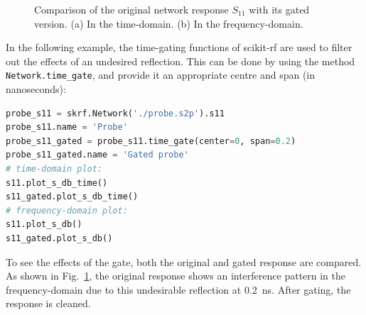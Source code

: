 \documentclass[10pt, letterpaper]{scrartcl}
\newcommand{\skrf}{{s}cikit-rf\xspace}
\begin{document}
\begin{figure}
	\centering
	\caption{Comparison of the original network response $S_{11}$ with its gated version. (a) In the time-domain. (b) In the frequency-domain.}
	\label{figs:gating}
\end{figure}

In the following example, the time-gating functions of \skrf{} are used to filter out the effects of an undesired reflection. This can be done by using the method \texttt{Network.time\_gate}, and provide it an appropriate centre and span (in nanoseconds):

\begin{lstlisting}[language=Python]
probe_s11 = skrf.Network('./probe.s2p').s11
probe_s11.name = 'Probe'
probe_s11_gated = probe_s11.time_gate(center=0, span=0.2)
probe_s11_gated.name = 'Gated probe'
# time-domain plot:
s11.plot_s_db_time()
s11_gated.plot_s_db_time()
# frequency-domain plot:
s11.plot_s_db()
s11_gated.plot_s_db()
\end{lstlisting}

To see the effects of the gate, both the original and gated response are compared. As shown in Fig.~\ref{figs:gating}, the original response shows an interference pattern in the frequency-domain due to this undesirable reflection at \SI{0.2}{\nano\second}. After gating, the response is cleaned.
\end{document}

